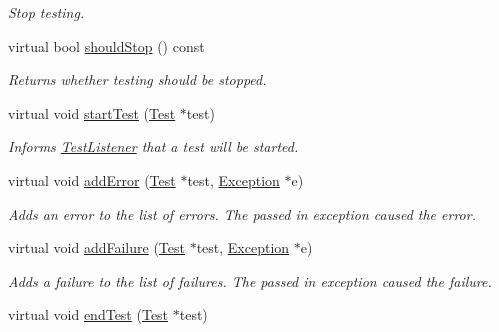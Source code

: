 \begin{DoxyCompactItemize}
\begin{DoxyCompactList}\small\item\em Stop testing. \end{DoxyCompactList}\item 
\hypertarget{class_test_result_a20831556df184132ea80836c196ed333}{virtual bool \hyperlink{class_test_result_a20831556df184132ea80836c196ed333}{should\-Stop} () const }\label{class_test_result_a20831556df184132ea80836c196ed333}

\begin{DoxyCompactList}\small\item\em Returns whether testing should be stopped. \end{DoxyCompactList}\item 
\hypertarget{class_test_result_a4acd959411284f57a26eefe4c79c30d3}{virtual void \hyperlink{class_test_result_a4acd959411284f57a26eefe4c79c30d3}{start\-Test} (\hyperlink{class_test}{Test} $\ast$test)}\label{class_test_result_a4acd959411284f57a26eefe4c79c30d3}

\begin{DoxyCompactList}\small\item\em Informs \hyperlink{class_test_listener}{Test\-Listener} that a test will be started. \end{DoxyCompactList}\item 
\hypertarget{class_test_result_a25b7f26ec9a52ea4e05b38a490d381c5}{virtual void \hyperlink{class_test_result_a25b7f26ec9a52ea4e05b38a490d381c5}{add\-Error} (\hyperlink{class_test}{Test} $\ast$test, \hyperlink{class_exception}{Exception} $\ast$e)}\label{class_test_result_a25b7f26ec9a52ea4e05b38a490d381c5}

\begin{DoxyCompactList}\small\item\em Adds an error to the list of errors. The passed in exception caused the error. \end{DoxyCompactList}\item 
\hypertarget{class_test_result_a648e7986cd583f7687dfaa88b5b2c080}{virtual void \hyperlink{class_test_result_a648e7986cd583f7687dfaa88b5b2c080}{add\-Failure} (\hyperlink{class_test}{Test} $\ast$test, \hyperlink{class_exception}{Exception} $\ast$e)}\label{class_test_result_a648e7986cd583f7687dfaa88b5b2c080}

\begin{DoxyCompactList}\small\item\em Adds a failure to the list of failures. The passed in exception caused the failure. \end{DoxyCompactList}\item 
\hypertarget{class_test_result_abad5c059d9f01f251057c6065a5c35b3}{virtual void \hyperlink{class_test_result_abad5c059d9f01f251057c6065a5c35b3}{end\-Test} (\hyperlink{class_test}{Test} $\ast$test)}\label{class_test_result_abad5c059d9f01f251057c6065a5c35b3}


\end{DoxyCompactItemize}
